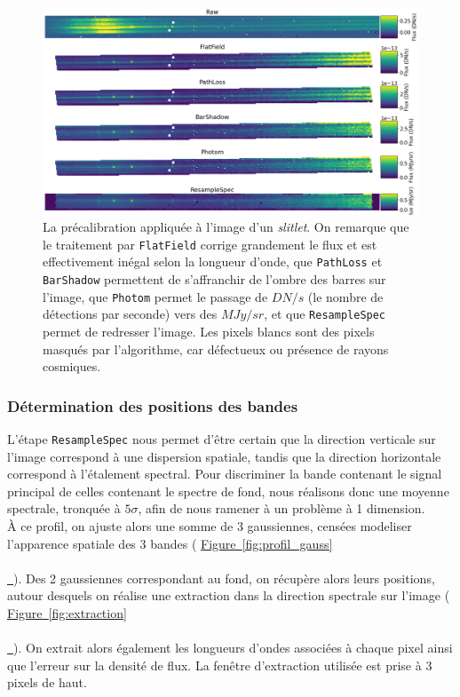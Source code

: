 \documentclass[12pt, a4paper]{article}
\newcommand*{\figref}[2][]{%
  \hyperref[{#2}]{%
    Figure~\ref*{#2}%
    \ifx\\#1\\%
    \else
      \,#1%
    \fi
  }%
}
\begin{document}
\begin{figure}[H]
  \centering
  \includegraphics[scale=0.45]{assets/precal.png}
  \caption{La précalibration appliquée à l'image d'un \textit{slitlet}. On remarque que le traitement par \texttt{FlatField} corrige grandement le flux et est effectivement inégal selon la longueur d'onde, que \texttt{PathLoss} et \texttt{BarShadow} permettent de s'affranchir de l'ombre des barres sur l'image, que \texttt{Photom} permet le passage de $DN/s$ (le nombre de détections par seconde) vers des $MJy/sr$, et que \texttt{ResampleSpec} permet de redresser l'image. Les pixels blancs sont des pixels masqués par l'algorithme, car défectueux ou présence de rayons cosmiques.}
  \label{fig:precal}
\end{figure}


\subsubsection{Détermination des positions des bandes}

L'étape \texttt{ResampleSpec} nous permet d'être certain que la direction verticale sur l'image correspond à une dispersion spatiale, tandis que la direction horizontale correspond à l'étalement spectral. Pour discriminer la bande contenant le signal principal de celles contenant le spectre de fond, nous réalisons donc une moyenne spectrale, tronquée à $5\sigma$, afin de nous ramener à un problème à 1 dimension.\\

À ce profil, on ajuste alors une somme de 3 gaussiennes, censées modeliser l'apparence spatiale des 3 bandes (\figref{fig:profil_gauss}). Des 2 gaussiennes correspondant au fond, on récupère alors leurs positions, autour desquels on réalise une extraction dans la direction spectrale sur l'image (\figref{fig:extraction}). On extrait alors également les longueurs d'ondes associées à chaque pixel ainsi que l'erreur sur la densité de flux. La fenêtre d'extraction utilisée est prise à 3 pixels de haut.
\end{document}
